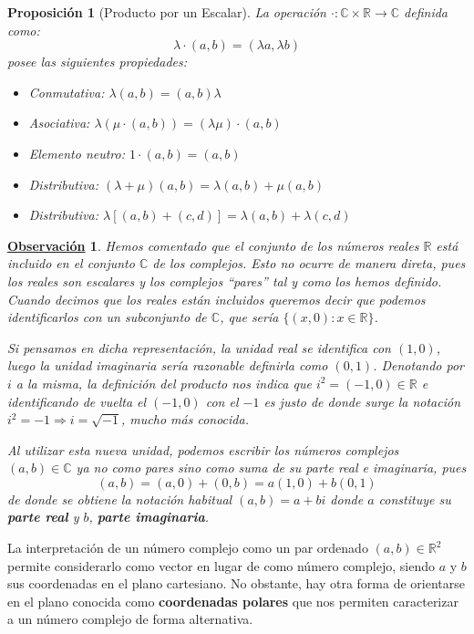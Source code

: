 \documentclass[10pt,a4paper,openright]{book}
\theoremstyle{break}
\newtheorem{prop}{Proposición}[chapter]
\newtheorem{obs}{\underline{Observación}}[chapter]
\begin{document}
\begin{prop}[Producto por un Escalar]
La operación $\cdot : \mathbb{C}\times \mathbb{R}\rightarrow \mathbb{C}$ definida como:
\[
\lambda \cdot (a,b)=(\lambda a,\lambda b)
\]
posee las siguientes propiedades:
\begin{itemize}
\item Conmutativa: $\lambda(a,b)=(a,b)\lambda$
\item Asociativa: $\lambda(\mu \cdot (a,b))=(\lambda\mu)\cdot (a,b)$
\item Elemento neutro: $1\cdot (a,b)=(a,b)$
\item Distributiva: $(\lambda+\mu)(a,b)=\lambda (a,b)+\mu (a,b)$\par
\item Distributiva: $\lambda[(a,b)+(c,d)]=\lambda(a,b)+\lambda(c,d)$
\end{itemize}
\end{prop}

\begin{obs}
Hemos comentado que el conjunto de los números reales $\mathbb{R}$ está incluido en el conjunto $\mathbb C$ de los complejos. Esto no ocurre de manera direta, pues los reales son escalares y los complejos ``pares'' tal y como los hemos definido. Cuando decimos que los reales están incluidos queremos decir que podemos identificarlos con un subconjunto de $\mathbb C$, que sería $\{(x,0) : x\in \mathbb R\}$.

Si pensamos en dicha representación, la unidad real se identifica con $(1,0)$, luego la unidad imaginaria sería razonable definirla como $(0,1)$. Denotando por $i$ a la misma, la definición del producto nos indica que $i^2=(-1,0)\in \mathbb R$ e identificando de vuelta el $(-1, 0)$ con el $-1$ es justo de donde surge la notación $i^2=-1\Rightarrow i=\sqrt{-1}$, mucho más conocida.

Al utilizar esta nueva unidad, podemos escribir los números complejos $(a,b)\in \mathbb C$ ya no como pares sino como suma de su parte real e imaginaria, pues
\[
(a,b)=(a,0)+(0,b)=a(1,0)+b(0,1)
\]
de donde se obtiene la notación habitual $(a,b)=a+bi$ donde $a$ constituye su \textbf{parte real} y $b$, \textbf{parte imaginaria}.
\end{obs}

La interpretación de un número complejo como un par ordenado $(a,b)\in \mathbb{R}^2$ permite considerarlo como vector en lugar de como número complejo, siendo $a$ y $b$ sus coordenadas en el plano cartesiano. No obstante, hay otra forma de orientarse en el plano conocida como \textbf{coordenadas polares} que nos permiten caracterizar a un número complejo de forma alternativa.
\end{document}
